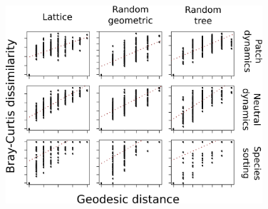 \documentclass[12pt]{article}
\begin{document}
\begin{figure}[ht!]
	\centering\includegraphics[width=0.85\textwidth]{BetaTopoDist.png}
\end{figure}

\newpage

\end{document}
